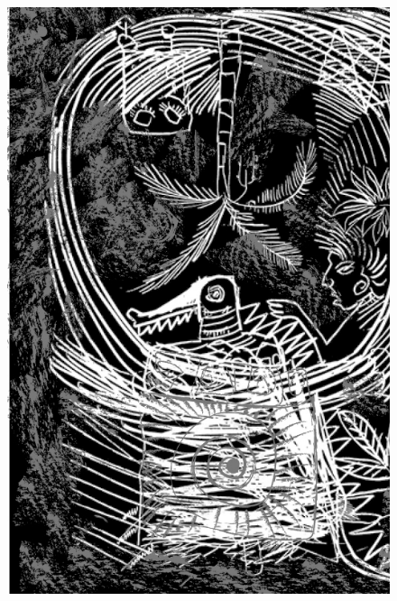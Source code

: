 \begin{figure}
\vspace*{-1.5cm}
\hspace*{-2.4cm}\includegraphics[width=142mm]{./imgs/img6.jpg}
\end{figure}

\chapter*{}


